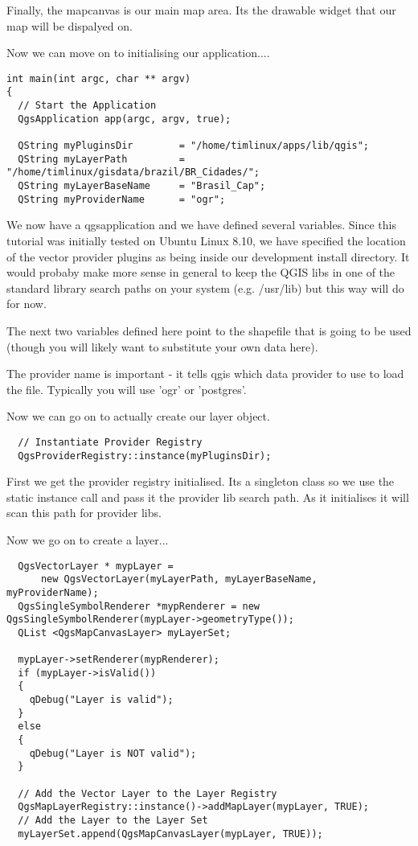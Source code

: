Finally, the mapcanvas is our main map area. Its the drawable
widget that our map will be dispalyed on.

Now we can move on to initialising our application....

\begin{verbatim}
int main(int argc, char ** argv)
{
  // Start the Application
  QgsApplication app(argc, argv, true);

  QString myPluginsDir        = "/home/timlinux/apps/lib/qgis";
  QString myLayerPath         = "/home/timlinux/gisdata/brazil/BR_Cidades/";
  QString myLayerBaseName     = "Brasil_Cap";
  QString myProviderName      = "ogr";

\end{verbatim}

We now have a qgsapplication and we have defined several variables. Since this 
tutorial was initially tested on Ubuntu Linux 8.10, we have specified the 
location of the vector provider plugins as being inside our development install 
directory. It would probaby make more sense in general to keep the QGIS libs in one of the
standard library search paths on your system (e.g. /usr/lib) but this way
will do for now.

The next two variables defined here point to the shapefile that is going to
be used (though you will likely want to substitute your own data here).

The provider name is important - it tells qgis which data provider to use to
load the file. Typically you will use 'ogr' or 'postgres'.

Now we can go on to actually create our layer object.

\begin{verbatim}
  // Instantiate Provider Registry
  QgsProviderRegistry::instance(myPluginsDir);
\end{verbatim}

First we get the provider registry initialised. Its a singleton class so we
use the static instance call and pass it the provider lib search path. As it
initialises it will scan this path for provider libs.

Now we go on to create a layer...

\begin{verbatim}
  QgsVectorLayer * mypLayer =
      new QgsVectorLayer(myLayerPath, myLayerBaseName, myProviderName);
  QgsSingleSymbolRenderer *mypRenderer = new
QgsSingleSymbolRenderer(mypLayer->geometryType());
  QList <QgsMapCanvasLayer> myLayerSet;

  mypLayer->setRenderer(mypRenderer);
  if (mypLayer->isValid())
  {
    qDebug("Layer is valid");
  }
  else
  {
    qDebug("Layer is NOT valid");
  }

  // Add the Vector Layer to the Layer Registry
  QgsMapLayerRegistry::instance()->addMapLayer(mypLayer, TRUE);
  // Add the Layer to the Layer Set
  myLayerSet.append(QgsMapCanvasLayer(mypLayer, TRUE));

\end{verbatim}

